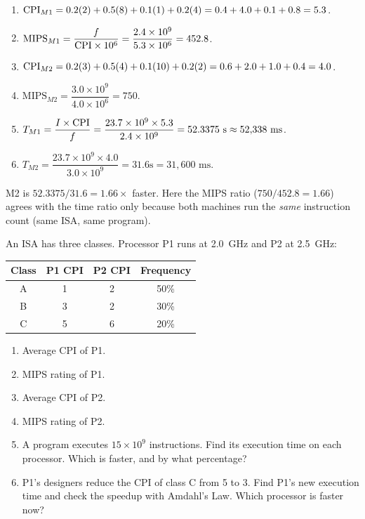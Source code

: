 \documentclass[11pt]{article}
\begin{document}
\begin{solution}
\leavevmode
\begin{enumerate}[label=(\alph*),leftmargin=*]
  \item $\mathrm{CPI}_{M1} = 0.2(2) + 0.5(8) + 0.1(1) + 0.2(4) = 0.4+4.0+0.1+0.8 =
  5.3$.
  \item $\text{MIPS}_{M1} = \dfrac{f}{\mathrm{CPI}\times10^6} =
  \dfrac{2.4\times10^9}{5.3\times10^6} = 452.8$.
  \item $\mathrm{CPI}_{M2} = 0.2(3) + 0.5(4) + 0.1(10) + 0.2(2) = 0.6+2.0+1.0+0.4 =
  4.0$.
  \item $\text{MIPS}_{M2} = \dfrac{3.0\times10^9}{4.0\times10^6} = 750$.
  \item $T_{M1} = \dfrac{I\times\mathrm{CPI}}{f} = \dfrac{23.7\times10^9\times5.3}
  {2.4\times10^9} = 52.3375\text{ s} \approx 52{,}338\text{ ms}$.
  \item $T_{M2} = \dfrac{23.7\times10^9\times4.0}{3.0\times10^9} = 31.6\text{
  s} = 31{,}600\text{ ms}$.
\end{enumerate}
M2 is $52.3375/31.6 = 1.66\times$ faster. Here the MIPS ratio
($750/452.8 = 1.66$) agrees with the time ratio only because both machines
run the \emph{same} instruction count (same ISA, same program).
\end{solution}

\begin{exercise}\label{x:p1p2}
An ISA has three classes. Processor P1 runs at 2.0~GHz and P2 at 2.5~GHz:
\begin{center}
\begin{tabular}{@{}cccc@{}}
\toprule
Class & P1 CPI & P2 CPI & Frequency \\
\midrule
A & 1 & 2 & 50\% \\
B & 3 & 2 & 30\% \\
C & 5 & 6 & 20\% \\
\bottomrule
\end{tabular}
\end{center}
\begin{enumerate}[label=(\alph*),leftmargin=*]
  \item Average CPI of P1.
  \item MIPS rating of P1.
  \item Average CPI of P2.
  \item MIPS rating of P2.
  \item A program executes $15\times10^9$ instructions. Find its execution
  time on each processor. Which is faster, and by what percentage?
  \item P1's designers reduce the CPI of class C from 5 to 3. Find P1's new
  execution time and check the speedup with Amdahl's Law. Which processor is
  faster now?
\end{enumerate}
\end{exercise}
\end{document}
